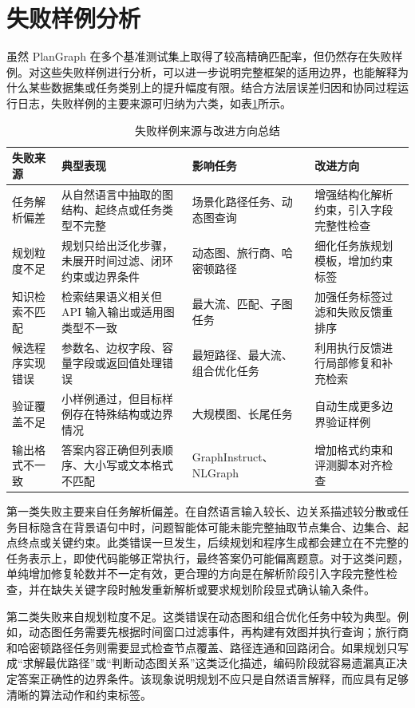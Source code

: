 \section{失败样例分析}

虽然 PlanGraph 在多个基准测试集上取得了较高精确匹配率，但仍然存在失败样例。对这些失败样例进行分析，可以进一步说明完整框架的适用边界，也能解释为什么某些数据集或任务类别上的提升幅度有限。结合方法层误差归因和协同过程运行日志，失败样例的主要来源可归纳为六类，如表\ref{tab:failure_summary_ch5}所示。

\begin{table}[htbp]
\centering
\small
\caption{失败样例来源与改进方向总结}
\label{tab:failure_summary_ch5}
\begin{tabularx}{\textwidth}{p{2.6cm}p{4.1cm}p{3.4cm}X}
\toprule
失败来源 & 典型表现 & 影响任务 & 改进方向 \\
\midrule
任务解析偏差 & 从自然语言中抽取的图结构、起终点或任务类型不完整 & 场景化路径任务、动态图查询 & 增强结构化解析约束，引入字段完整性检查 \\
规划粒度不足 & 规划只给出泛化步骤，未展开时间过滤、闭环约束或边界条件 & 动态图、旅行商、哈密顿路径 & 细化任务族规划模板，增加约束标签 \\
知识检索不匹配 & 检索结果语义相关但 API 输入输出或适用图类型不一致 & 最大流、匹配、子图任务 & 加强任务标签过滤和失败反馈重排序 \\
候选程序实现错误 & 参数名、边权字段、容量字段或返回值处理错误 & 最短路径、最大流、组合优化任务 & 利用执行反馈进行局部修复和补充检索 \\
验证覆盖不足 & 小样例通过，但目标样例存在特殊结构或边界情况 & 大规模图、长尾任务 & 自动生成更多边界验证样例 \\
输出格式不一致 & 答案内容正确但列表顺序、大小写或文本格式不匹配 & GraphInstruct、NLGraph & 增加格式约束和评测脚本对齐检查 \\
\bottomrule
\end{tabularx}
\end{table}

第一类失败主要来自任务解析偏差。在自然语言输入较长、边关系描述较分散或任务目标隐含在背景语句中时，问题智能体可能未能完整抽取节点集合、边集合、起点终点或关键约束。此类错误一旦发生，后续规划和程序生成都会建立在不完整的任务表示上，即使代码能够正常执行，最终答案仍可能偏离题意。对于这类问题，单纯增加修复轮数并不一定有效，更合理的方向是在解析阶段引入字段完整性检查，并在缺失关键字段时触发重新解析或要求规划阶段显式确认输入条件。

第二类失败来自规划粒度不足。这类错误在动态图和组合优化任务中较为典型。例如，动态图任务需要先根据时间窗口过滤事件，再构建有效图并执行查询；旅行商和哈密顿路径任务则需要显式检查节点覆盖、路径连通和回路闭合。如果规划只写成“求解最优路径”或“判断动态图关系”这类泛化描述，编码阶段就容易遗漏真正决定答案正确性的边界条件。该现象说明规划不应只是自然语言解释，而应具有足够清晰的算法动作和约束标签。

